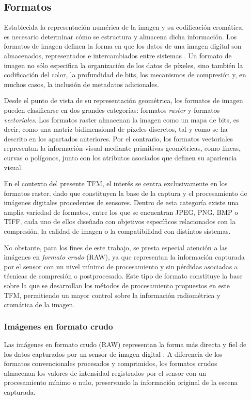 \newpage

\subsection{Formatos} \label{subsec:3_4_formatos}
Establecida la representación numérica de la imagen y su codificación cromática, es necesario determinar
cómo se estructura y almacena dicha información.
Los formatos de imagen definen la forma en que los datos de una imagen digital son almacenados, 
representados e intercambiados entre sistemas \cite{image_formats}. Un formato de imagen no sólo especifica la organización de 
los datos de píxeles, sino también la codificación del color, la profundidad de bits, los mecanismos de 
compresión y, en muchos casos, la inclusión de metadatos adicionales.

Desde el punto de vista de su representación geométrica, los formatos de imagen pueden clasificarse en
dos grandes categorías: formatos \textit{raster} y formatos \textit{vectoriales}. Los formatos raster
almacenan la imagen como un mapa de bits, es decir, como una matriz bidimensional de píxeles discretos,
tal y como se ha descrito en los apartados anteriores. Por el contrario, los formatos vectoriales
representan la información visual mediante primitivas geométricas, como líneas, curvas o polígonos, junto
con los atributos asociados que definen su apariencia visual.

En el contexto del presente TFM, el interés se centra exclusivamente en los formatos raster, dado que
constituyen la base de la captura y el procesamiento de imágenes digitales procedentes de sensores. Dentro
de esta categoría existe una amplia variedad de formatos, entre los que se encuentran JPEG, PNG, BMP o
TIFF, cada uno de ellos diseñado con objetivos específicos relacionados con la compresión, la calidad de
imagen o la compatibilidad con distintos sistemas.

No obstante, para los fines de este trabajo, se presta especial atención a las imágenes en \textit{formato
crudo} (RAW), ya que representan la información capturada por el sensor con un nivel mínimo de
procesamiento y sin pérdidas asociadas a técnicas de compresión o postprocesado. Este tipo de formato
constituye la base sobre la que se desarrollan los métodos de procesamiento propuestos en este TFM,
permitiendo un mayor control sobre la información radiométrica y cromática de la imagen.

\subsubsection{Imágenes en formato crudo} \label{subsec:3_4_1_formato_crudo}
Las imágenes en formato crudo (RAW) representan la forma más directa y fiel de los datos capturados
por un sensor de imagen digital \cite{raw_image_formats}. A diferencia de los formatos convencionales procesados
y comprimidos, los formatos crudos almacenan los valores de intensidad registrados por el sensor con un procesamiento 
mínimo o nulo, preservando la información original de la escena capturada.

